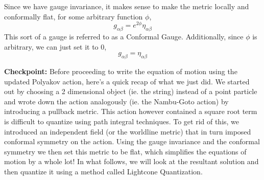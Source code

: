 \documentclass{article}
\begin{document}
Since we have gauge invariance, it makes sense to make the metric locally and conformally flat, for some arbitrary function $\phi$,
\begin{equation}
	g_{\alpha\beta} = e^{2\phi}\eta_{\alpha\beta}
\end{equation}
This sort of a gauge is referred to as a Conformal Gauge. Additionally, since $\phi$ is arbitrary, we can just set it to 0,
\begin{equation}
	g_{\alpha\beta} =\eta_{\alpha\beta}
\end{equation}

\textbf{Checkpoint:} Before proceeding to write the equation of motion using the updated Polyakov action, here's a quick recap of what we just did. We started out by choosing a 2 dimensional object (ie. the string) instead of a point particle and wrote down the action analogously (ie. the Nambu-Goto action) by introducing a pullback metric. This action however contained a square root term is difficult to quantize using path integral techniques. To get rid of this, we introduced an independent field (or the worldline metric) that in turn imposed conformal symmetry on the action. Using the gauge invariance and the conformal symmetry we then set this metric to be flat, which simplifies the equations of motion by a whole lot! In what follows, we will look at the resultant solution and then quantize it using a method called Lightcone Quantization.
\end{document}
